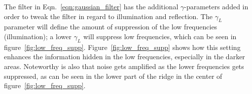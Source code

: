 		The filter in Eqn.~\ref{eqn:gaussian_filter} has the additional $\gamma$-parameters added in order to tweak
		the filter in regard to illumination and reflection. The $\gamma_L$ parameter
		will define the amount of suppression of the low frequencies (illumination); a lower $\gamma_L$
		will suppress low frequencies, which can be seen in figure~\ref{fig:low_freq_supp}.
		Figure~\ref{fig:low_freq_supp} shows how this setting enhances the information hidden 
		in the low frequencies, especially in the darker areas.
		Noteworthy is also that noise gets amplified as the lower frequencies gets suppressed, as can
		be seen in the lower part of the ridge in the center of figure~\ref{fig:low_freq_supp}.
